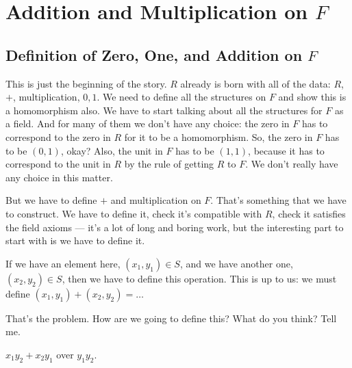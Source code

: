 \section{Addition and Multiplication on \texorpdfstring{$F$}{F}}

\subsection{Definition of Zero, One, and Addition on \texorpdfstring{$F$}{F}}

\begin{speech}[00:56:33 - 00:58:40]
This is just the beginning of the story. $R$ already is born with all of the data: $R$, $+$, multiplication, $0, 1$.  We need to define all the structures on $F$ and show this is a homomorphism also. 
We have to start talking about all the structures for $F$ as a field. And for many of them we don't have any choice: the zero in $F$ has to correspond to the zero in $R$ for it to be a homomorphism. So, the zero in $F$ has to be $(0, 1)$,  okay? Also, the unit in $F$ has to be $(1, 1)$,  because it has to correspond to the unit in $R$ by the rule of getting $R$ to $F$. We don't really have any choice in this matter.

But we have to define $+$ and multiplication on $F$.  That's something that we have to construct. We have to define it, check it's compatible with $R$, check it satisfies the field axioms --- it's a lot of long and boring work, but the interesting part to start with is we have to define it.

If we have an element here, $(x_1, y_1) \in S$,  and we have another one, $(x_2, y_2) \in S$,  then we have to define this operation. This is up to us: we must define $(x_1, y_1) + (x_2, y_2) = \dots$ 

That's the problem. How are we going to define this? What do you think? Tell me.
\end{speech}

\begin{student}
$x_1 y_2 + x_2 y_1$ over $y_1 y_2$.
\end{student}

